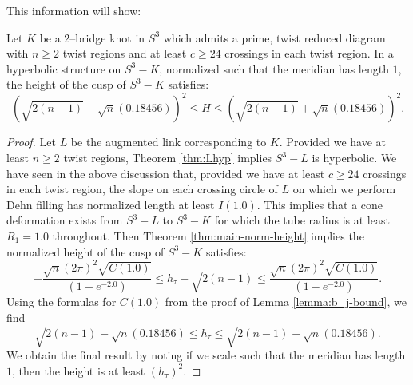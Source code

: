 This information will show:


\begin{prop}
  Let $K$ be a 2--bridge knot in $S^3$ which admits a prime, twist
  reduced diagram with $n\geq 2$ twist regions and at least $c\geq 24$
  crossings in each twist region.  In a hyperbolic structure on
  $S^3-K$, normalized such that the meridian has length $1$, the
  height of the cusp of $S^3-K$ satisfies:
  $$\left(\sqrt{2(n-1)} - \sqrt{n}(0.18456)\right)^2 \leq H \leq
	\left(\sqrt{2(n-1)} + \sqrt{n}(0.18456)\right)^2.$$
\label{prop:2bridge}
\end{prop}

\begin{proof}
Let $L$ be the augmented link corresponding to $K$.  Provided we have
at least $n\geq 2$ twist regions, Theorem \ref{thm:Lhyp} implies
$S^3-L$ is hyperbolic.  We have seen in the above discussion that,
provided we have at least $c\geq 24$ crossings in each twist region,
the slope on each crossing circle of $L$ on which we perform Dehn
filling has normalized length at least $I(1.0)$.  This implies that a
cone deformation exists from $S^3-L$ to $S^3-K$ for which the tube
radius is at least $R_1= 1.0$ throughout.  Then Theorem
\ref{thm:main-norm-height} implies the normalized height of the cusp
of $S^3-K$ satisfies:
$$-\frac{\sqrt{n}(2\pi)^2\sqrt{C(1.0)}}{(1-e^{-2.0})} \leq
 h_{\tau} - \sqrt{2(n-1)} \leq
 \frac{\sqrt{n}(2\pi)^2\sqrt{C(1.0)}}{(1-e^{-2.0})}.$$
Using the formulas for $C(1.0)$ from the proof of Lemma
 \ref{lemma:b_j-bound}, we find
$$\sqrt{2(n-1)} - \sqrt{n}(0.18456) \leq h_{\tau} \leq
 \sqrt{2(n-1)} + \sqrt{n}(0.18456).$$
We obtain the final result by noting if we scale such that the
meridian has length $1$, then the height is at least $(h_\tau)^2$.
\end{proof}





